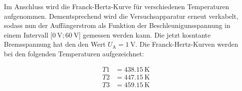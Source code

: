 \noindent Im Anschluss wird die Franck-Hertz-Kurve für verschiedenen Temperaturen aufgenommen. Dementsprechend wird die Versuchsapparatur erneut verkabelt, sodass 
nun der Auffängerstrom als Funktion der Beschleunigunsspannung in einem Intervall [$\qty{0}{\volt};\qty{60}{\volt}$] gemessen werden kann. Die jetzt kosntante 
Bremsspannung hat den den Wert $U_\text{A} = \qty{1}{\volt}$. Die Franck-Hertz-Kurven werden bei den folgenden Temperaturen aufgezeichnet:

\begin{align*}
    T1 &= \qty{438.15}{\kelvin} \\ 
    T2 &= \qty{447.15}{\kelvin} \\  
    T3 &= \qty{459.15}{\kelvin} \\  
\end{align*}



%

